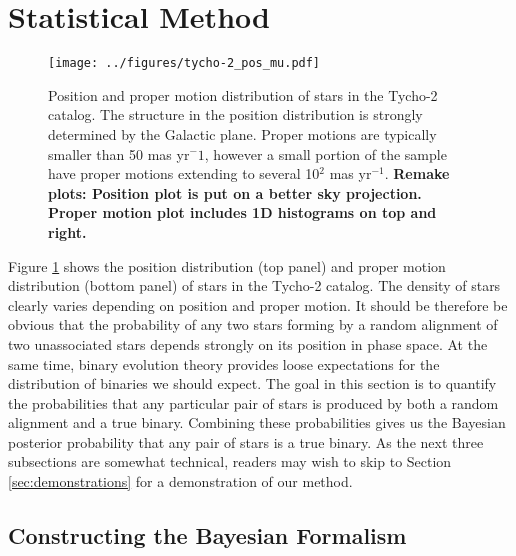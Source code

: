 \documentclass[usenatbib]{mnras}
\begin{document}
\section{Statistical Method}


\begin{figure}
\begin{center}
\texttt{[image: ../figures/tycho-2\_pos\_mu.pdf]}
\caption{ Position and proper motion distribution of stars in the Tycho-2 catalog. The structure in the position distribution is strongly determined by the Galactic plane. Proper motions are typically smaller than 50 mas yr$^-1$, however a small portion of the sample have proper motions extending to several 10$^2$ mas yr$^{-1}$. {\bf Remake plots: Position plot is put on a better sky projection. Proper motion plot includes 1D histograms on top and right.}}
\label{fig:tycho-2_pos_mu}
\end{center}
\end{figure}


Figure \ref{fig:tycho-2_pos_mu} shows the position distribution (top panel) and proper motion distribution (bottom panel) of stars in the Tycho-2 catalog. The density of stars clearly varies depending on position and proper motion. It should be therefore be obvious that the probability of any two stars forming by a random alignment of two unassociated stars depends strongly on its position in phase space. At the same time, binary evolution theory provides loose expectations for the distribution of binaries we should expect. The goal in this section is to quantify the probabilities that any particular pair of stars is produced by both a random alignment and a true binary. Combining these probabilities gives us the Bayesian posterior probability that any pair of stars is a true binary. As the next three subsections are somewhat technical, readers may wish to skip to Section \ref{sec:demonstrations} for a demonstration of our method.


\subsection{Constructing the Bayesian Formalism}
\end{document}
